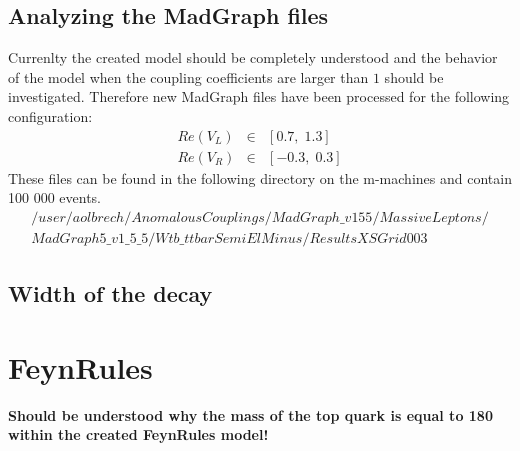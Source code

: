 \subsection{Analyzing the MadGraph files}\label{subsec:MadGraphFiles}
Currenlty the created model should be completely understood and the behavior of the model when the coupling coefficients are larger than $1$ should be investigated. Therefore new MadGraph files have been processed for the following configuration:
\begin{eqnarray*}
  Re(V_L) & \in & \left[  0.7, \; 1.3\right] \\
  Re(V_R) & \in & \left[ -0.3, \; 0.3\right]
\end{eqnarray*}
These files can be found in the following directory on the m-machines and contain 100 000 events.
\begin{eqnarray*}
  /user/aolbrech/AnomalousCouplings/MadGraph\_v155/MassiveLeptons/\\ MadGraph5\_v1\_5\_5/Wtb\_ttbarSemiElMinus/ResultsXSGrid003
\end{eqnarray*}

\subsection{Width of the decay}\label{subsec:DecayWidth}

\section{FeynRules}
\textbf{Should be understood why the mass of the top quark is equal to 180 within the created FeynRules model!}
